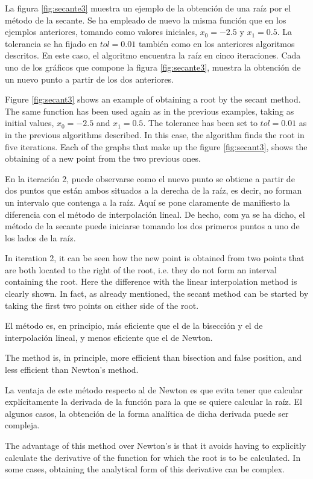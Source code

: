 \begin{paracol}{2}
La figura \ref{fig:secante3} muestra un ejemplo de la obtención de una raíz por el método de la secante. Se ha empleado de nuevo la misma función que en los ejemplos anteriores, tomando como valores iniciales, $x_0=-2.5$ y $x_1=0.5$. La tolerancia se ha fijado en $tol=0.01$ también como en los anteriores algoritmos descritos. En este caso, el algoritmo encuentra la raíz en cinco iteraciones. Cada uno de los gráficos que compone la figura \ref{fig:secante3}, muestra la obtención de un nuevo punto a partir de los dos anteriores. 

    \switchcolumn
Figure \ref{fig:secant3} shows an example of obtaining a root by the secant method. The same function has been used again as in the previous examples, taking as initial values, $x_0=-2.5$ and $x_1=0.5$. The tolerance has been set to $tol=0.01$ as in the previous algorithms described. In this case, the algorithm finds the root in five iterations. Each of the graphs that make up the figure \ref{fig:secant3}, shows the obtaining of a new point from the two previous ones. 
    \switchcolumn

En la iteración 2, puede observarse como el nuevo punto se obtiene a partir de dos puntos que están ambos situados a la derecha de la raíz, es decir, no forman un intervalo que contenga a la raíz.  Aquí se pone claramente de manifiesto la diferencia con el método de interpolación lineal. De hecho, com ya se ha dicho, el método de la secante puede iniciarse tomando los dos primeros puntos a uno de los lados de la raíz.

\switchcolumn
In iteration 2, it can be seen how the new point is obtained from two points that are both located to the right of the root, i.e. they do not form an interval containing the root.  Here the difference with the linear interpolation method is clearly shown. In fact, as already mentioned, the secant method can be started by taking the first two points on either side of the root.

\switchcolumn
 El método es, en principio, más eficiente que el de la bisección y el de interpolación lineal, y menos eficiente que el de Newton.
\switchcolumn

 The method is, in principle, more efficient than bisection and false position, and less efficient than Newton's method.

 \switchcolumn
 La ventaja de este método respecto al de Newton es que evita tener que calcular explícitamente la derivada de la función para la que se quiere calcular la raíz. El algunos casos, la obtención de la forma analítica de dicha derivada puede ser compleja.   
\switchcolumn

The advantage of this method over Newton's is that it avoids having to explicitly calculate the derivative of the function for which the root is to be calculated. In some cases, obtaining the analytical form of this derivative can be complex.  

\end{paracol}








